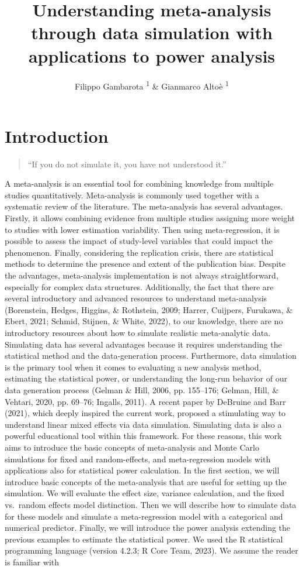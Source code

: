 \documentclass[
  man,floatsintext]{apa6}
\title{Understanding meta-analysis through data simulation with applications to power analysis}
\author{Filippo Gambarota \orcidlink{0000-0002-6666-1747}\textsuperscript{1} \& Gianmarco Altoè \orcidlink{0000-0003-1154-9528}\textsuperscript{1}}
\date{}
\affiliation{\vspace{0.5cm}\textsuperscript{1} Department of Developmental and Social Psychology, University of Padova, Italy}
\begin{document}
\maketitle

\hypertarget{introduction}{%
\section{Introduction}\label{introduction}}

\begin{quote}
``If you do not simulate it, you have not understood it.''
\end{quote}

A meta-analysis is an essential tool for combining knowledge from multiple studies quantitatively. Meta-analysis is commonly used together with a systematic review of the literature. The meta-analysis has several advantages. Firstly, it allows combining evidence from multiple studies assigning more weight to studies with lower estimation variability. Then using meta-regression, it is possible to assess the impact of study-level variables that could impact the phenomenon. Finally, considering the replication crisis, there are statistical methods to determine the presence and extent of the publication bias. Despite the advantages, meta-analysis implementation is not always straightforward, especially for complex data structures. Additionally, the fact that there are several introductory and advanced resources to understand meta-analysis (Borenstein, Hedges, Higgins, \& Rothstein, 2009; Harrer, Cuijpers, Furukawa, \& Ebert, 2021; Schmid, Stijnen, \& White, 2022), to our knowledge, there are no introductory resources about how to simulate realistic meta-analytic data. Simulating data has several advantages because it requires understanding the statistical method and the data-generation process. Furthermore, data simulation is the primary tool when it comes to evaluating a new analysis method, estimating the statistical power, or understanding the long-run behavior of our data generation process (Gelman \& Hill, 2006, pp. 155--176; Gelman, Hill, \& Vehtari, 2020, pp. 69--76; Ingalls, 2011). A recent paper by DeBruine and Barr (2021), which deeply inspired the current work, proposed a stimulating way to understand linear mixed effects via data simulation. Simulating data is also a powerful educational tool within this framework. For these reasons, this work aims to introduce the basic concepts of meta-analysis and Monte Carlo simulations for fixed and random-effects, and meta-regression models with applications also for statistical power calculation. In the first section, we will introduce basic concepts of the meta-analysis that are useful for setting up the simulation. We will evaluate the effect size, variance calculation, and the fixed vs.~random effects model distinction. Then we will describe how to simulate data for these models and simulate a meta-regression model with a categorical and numerical predictor. Finally, we will introduce the power analysis extending the previous examples to estimate the statistical power. We used the R statistical programming language (version 4.2.3; R Core Team, 2023). We assume the reader is familiar with 
\end{document}
